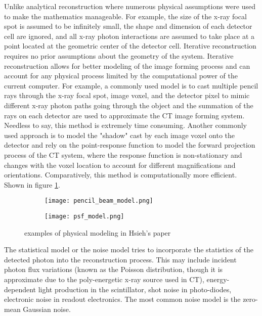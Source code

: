 Unlike analytical reconstruction where numerous physical assumptions were used to make the mathematics manageable.  For example, the size of the x-ray focal spot is assumed to be infinitely small, the shape and dimension of each detector cell are ignored, and all x-ray photon interactions are assumed to take place at a point located at the geometric center of the detector cell.  Iterative reconstruction requires no prior assumptions about the geometry of the system.  Iterative reconstruction allows for better modeling of the image forming process and can account for any physical process limited by the computational power of the current computer.  For example, a commonly used model is to cast multiple pencil rays through the x-ray focal spot, image voxel, and the detector pixel to mimic different x-ray photon paths going through the object and the summation of the rays on each detector are used to approximate the CT image forming system. Needless to say, this method is extremely time consuming.  Another commonly used approach is to model the "shadow" cast by each image voxel onto the detector and rely on the point-response function to model the forward projection process of the CT system, where the response function is non-stationary and changes with the voxel location to account for different magnifications and orientations.  Comparatively, this method is computationally more efficient.  Shown in figure \ref{fig:physical_modeling}.

\begin{figure}

	\begin{subfigure}[b]{0.4\linewidth}

	\texttt{[image: pencil\_beam\_model.png]}	
	\end{subfigure}
\hspace{0.2cm}
	\begin{subfigure}[b]{0.4\linewidth}

	\texttt{[image: psf\_model.png]}
	\end{subfigure}
\caption{examples of physical modeling in Hsieh's paper}
\label{fig:physical_modeling}
\end{figure}

The statistical model or the noise model tries to incorporate the statistics of the detected photon into the reconstruction process.  This may include incident photon flux variations (known as the Poisson distribution, though it is approximate due to the poly-energetic x-ray source used in CT), energy-dependent light production in the scintillator, shot noise in photo-diodes, electronic noise in readout electronics. The most common noise model is the zero-mean Gaussian noise.

